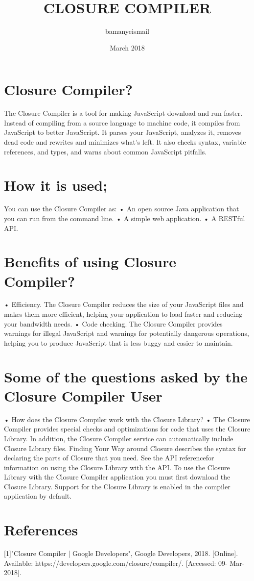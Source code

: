 \documentclass{article}
\title{CLOSURE COMPILER}
\author{bamanyeismail }
\date{March 2018}
\begin{document}
\maketitle
\section{Closure Compiler?}
The Closure Compiler is a tool for making JavaScript download and run faster. Instead of compiling from a source language to machine code, it compiles from JavaScript to better JavaScript. It parses your JavaScript, analyzes it, removes dead code and rewrites and minimizes what's left. It also checks syntax, variable references, and types, and warns about common JavaScript pitfalls.
\section{How it is used;}
You can use the Closure Compiler as:
\newline•  An open source Java application that you can run from the command line.
\newline•  A simple web application.
\newline•  A RESTful API.
\section{Benefits of using Closure Compiler?}
•	Efficiency. The Closure Compiler reduces the size of your JavaScript files and makes them more efficient, helping your application to load faster and reducing your bandwidth needs.
\newline•	Code checking. The Closure Compiler provides warnings for illegal JavaScript and warnings for potentially dangerous operations, helping you to produce JavaScript that is less buggy and easier to maintain.
       \section{Some of the questions asked by the Closure Compiler User}
•	How does the Closure Compiler work with the Closure Library?
\newline•	The Closure Compiler provides special checks and optimizations for code that uses the Closure Library. In addition, the Closure Compiler service can automatically include Closure Library files. Finding Your Way around Closure describes the syntax for declaring the parts of Closure that you need. See the API referencefor information on using the Closure Library with the API. To use the Closure Library with the Closure Compiler application you must first download the Closure Library. Support for the Closure Library is enabled in the compiler application by default.

\section{References}
[1]"Closure Compiler  |  Google Developers", Google Developers, 2018. [Online]. Available: https://developers.google.com/closure/compiler/. [Accessed: 09- Mar- 2018].
\end{document}
